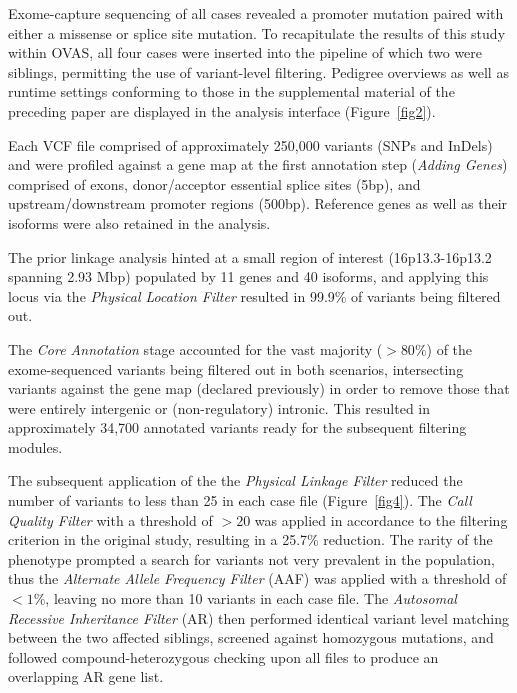 \documentclass[twocolumn]{bmcart}%
\def\app{OVAS}
\begin{document}
Exome-capture sequencing of all cases revealed a promoter mutation paired with either a missense or splice site mutation. To recapitulate the results of this study within \app{}, all four cases were inserted into the pipeline of which two were siblings, permitting the use of variant-level filtering. Pedigree overviews as well as runtime settings conforming to those in the supplemental material of the preceding paper are displayed in the analysis interface (Figure~\ref{fig2}).


Each VCF file comprised of approximately 250,000 variants (SNPs and InDels) and were profiled against a gene map at the first annotation step (\textit{Adding Genes}) comprised of exons, donor/acceptor essential splice sites (5bp), and upstream/downstream promoter regions (500bp). Reference genes as well as their isoforms were also retained in the analysis.

The prior linkage analysis \cite{cabezas2017polycystic} hinted at a small region of interest (16p13.3-16p13.2 spanning 2.93 Mbp) populated by 11 genes and 40 isoforms, and applying this locus via the \textit{Physical Location Filter} resulted in 99.9\% of variants being filtered out.


The \textit{Core Annotation} stage accounted for the vast majority ($ > 80\% $) of the exome-sequenced variants being filtered out in both scenarios, intersecting variants against the gene map (declared previously) in order to remove those that were entirely intergenic or (non-regulatory) intronic. This resulted in approximately 34,700 annotated variants ready for the subsequent filtering modules.

The subsequent application of the the \textit{Physical Linkage Filter} reduced the number of variants to less than 25 in each case file (Figure~\ref{fig4}). The \textit{Call Quality Filter} with a threshold of $>20$ was applied in accordance to the filtering criterion in the original study, resulting in a 25.7\% reduction. The rarity of the phenotype prompted a search for variants not very prevalent in the population, thus the \textit{Alternate Allele Frequency Filter} (AAF) was applied with a threshold of $< 1\%$, leaving no more than 10 variants in each case file. The \textit{Autosomal Recessive Inheritance Filter} (AR) then performed identical variant level matching between the two affected siblings, screened against homozygous mutations, and followed compound-heterozygous checking upon all files to produce an overlapping AR gene list. 
\end{document}

